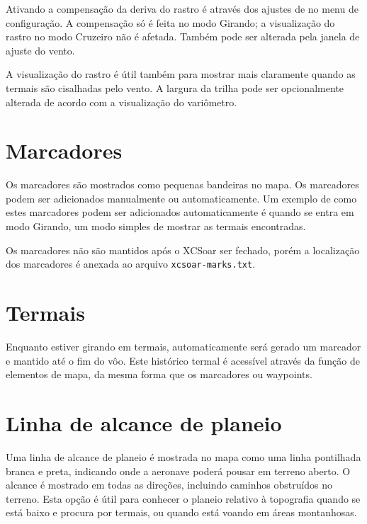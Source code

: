 Ativando a compensação da deriva do rastro é através dos ajustes de no menu de configuração. A compensação só é feita no modo Girando; a visualização do rastro no modo Cruzeiro não é afetada.  Também pode ser alterada pela janela de ajuste do vento.

A visualização do rastro é útil também para mostrar mais claramente quando as termais são cisalhadas pelo vento.
A largura da trilha pode ser opcionalmente alterada de acordo com a visualização do variômetro.  


\section{Marcadores}\label{sec:markers}

Os marcadores são mostrados como pequenas bandeiras no mapa.  Os marcadores podem ser adicionados manualmente ou automaticamente.  Um exemplo de como estes marcadores podem ser adicionados automaticamente é quando se entra em modo Girando, um modo simples de mostrar as termais encontradas.

Os marcadores não são mantidos após o XCSoar ser fechado, porém a localização dos marcadores é anexada ao arquivo
 \verb|xcsoar-marks.txt|.

\section{Termais}

Enquanto estiver girando em termais, automaticamente será gerado um marcador e mantido até o  fim do vôo.  Este histórico termal é acessível através da função de elementos de mapa, da mesma forma que os marcadores ou waypoints.


\section{Linha de alcance de planeio}\label{sec:reach}

Uma linha de alcance de planeio é mostrada no mapa como uma linha pontilhada branca e preta, indicando onde a aeronave poderá pousar em terreno aberto.  O alcance é mostrado em todas as direções, incluindo caminhos obstruídos no terreno.  Esta opção é útil para conhecer o planeio relativo à topografia quando se está baixo e procura por termais, ou quando está voando em áreas montanhosas.

